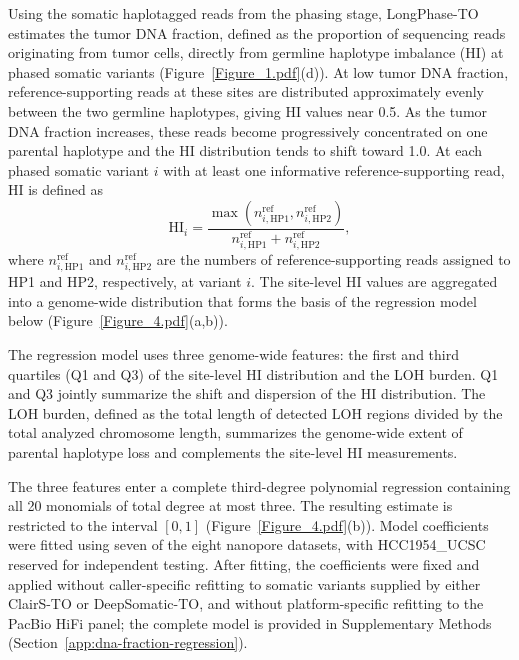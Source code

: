 \documentclass[pdflatex,sn-nature]{sn-jnl}
\begin{document}
Using the somatic haplotagged reads from the phasing stage, LongPhase-TO estimates the tumor DNA fraction, defined as the proportion of sequencing reads originating from tumor cells, directly from germline haplotype imbalance (HI) at phased somatic variants (Figure~\ref{Figure_1.pdf}(d)). At low tumor DNA fraction, reference-supporting reads at these sites are distributed approximately evenly between the two germline haplotypes, giving HI values near 0.5. As the tumor DNA fraction increases, these reads become progressively concentrated on one parental haplotype and the HI distribution tends to shift toward 1.0. At each phased somatic variant $i$ with at least one informative reference-supporting read, HI is defined as
\[
\mathrm{HI}_i =
\frac{\max\!\left(n^{\mathrm{ref}}_{i,\mathrm{HP1}},n^{\mathrm{ref}}_{i,\mathrm{HP2}}\right)}
{n^{\mathrm{ref}}_{i,\mathrm{HP1}}+n^{\mathrm{ref}}_{i,\mathrm{HP2}}},
\]
where $n^{\mathrm{ref}}_{i,\mathrm{HP1}}$ and $n^{\mathrm{ref}}_{i,\mathrm{HP2}}$ are the numbers of reference-supporting reads assigned to HP1 and HP2, respectively, at variant $i$. The site-level HI values are aggregated into a genome-wide distribution that forms the basis of the regression model below (Figure~\ref{Figure_4.pdf}(a,b)).

The regression model uses three genome-wide features: the first and third quartiles (Q1 and Q3) of the site-level HI distribution and the LOH burden. Q1 and Q3 jointly summarize the shift and dispersion of the HI distribution. The LOH burden, defined as the total length of detected LOH regions divided by the total analyzed chromosome length, summarizes the genome-wide extent of parental haplotype loss and complements the site-level HI measurements.

The three features enter a complete third-degree polynomial regression containing all 20 monomials of total degree at most three. The resulting estimate is restricted to the interval $[0,1]$ (Figure~\ref{Figure_4.pdf}(b)). Model coefficients were fitted using seven of the eight nanopore datasets, with HCC1954\_UCSC reserved for independent testing. After fitting, the coefficients were fixed and applied without caller-specific refitting to somatic variants supplied by either ClairS-TO or DeepSomatic-TO, and without platform-specific refitting to the PacBio HiFi panel; the complete model is provided in Supplementary Methods (Section~\ref{app:dna-fraction-regression}).
\end{document}
